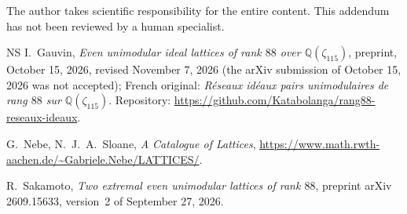\documentclass[11pt,a4paper]{amsart}
\theoremstyle{plain}
\theoremstyle{definition}
\newcommand{\Q}{\mathbb{Q}}
\begin{document}
The author takes scientific responsibility for the entire content. This addendum has not been reviewed by a human specialist.

\begin{thebibliography}{NS}
I.~Gauvin, \emph{Even unimodular ideal lattices of rank $88$ over $\Q(\zeta_{115})$}, preprint, October 15, 2026, revised November 7, 2026 (the arXiv submission of October 15, 2026 was not accepted); French original: \emph{R\'eseaux id\'eaux pairs unimodulaires de rang $88$ sur $\Q(\zeta_{115})$}. Repository: \url{https://github.com/Katabolanga/rang88-reseaux-ideaux}.

G.~Nebe, N.~J.~A.~Sloane, \emph{A Catalogue of Lattices}, \url{https://www.math.rwth-aachen.de/~Gabriele.Nebe/LATTICES/}.

R.~Sakamoto, \emph{Two extremal even unimodular lattices of rank $88$}, preprint arXiv 2609.15633, version~2 of September 27, 2026.
\end{thebibliography}
\end{document}
